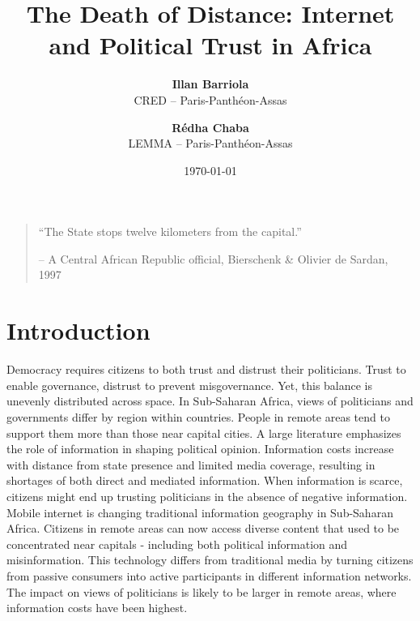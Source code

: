 \documentclass[11pt]{article}
\begin{document}
\title{The Death of Distance: Internet and Political Trust in Africa  \\  }

\author{
\textbf{Illan Barriola} \\ CRED -- Paris-Panthéon-Assas \\
\and 
\textbf{R\'{e}dha Chaba} \\ LEMMA -- Paris-Panthéon-Assas  \\
}

\date{\today}

\maketitle

\newpage

\begin{quotation}
\noindent ``The State stops twelve kilometers from the capital.'' 

\smallskip

\hfill -- A Central African Republic official, Bierschenk \& Olivier de Sardan, 1997 
\end{quotation}

\section{Introduction}


Democracy requires citizens to both trust and distrust their politicians. Trust to enable governance, distrust to prevent misgovernance.
Yet, this balance is unevenly distributed across space.
In Sub-Saharan Africa, views of politicians and governments differ by region within countries.
People in remote areas tend to support them more than those near capital cities.
A large literature emphasizes the role of information in shaping political opinion.
Information costs increase with distance from state presence and limited media coverage, resulting in shortages of both direct and mediated information.
When information is scarce, citizens might end up trusting politicians in the absence of negative information.\\

Mobile internet is changing traditional information geography in Sub-Saharan Africa. Citizens in remote areas can now access diverse content that used to be concentrated near capitals - including both political information and misinformation.
This technology differs from traditional media by turning citizens from passive consumers into active participants in different information networks.
The impact on views of politicians is likely to be larger in remote areas, where information costs have been highest.\\
\end{document}

